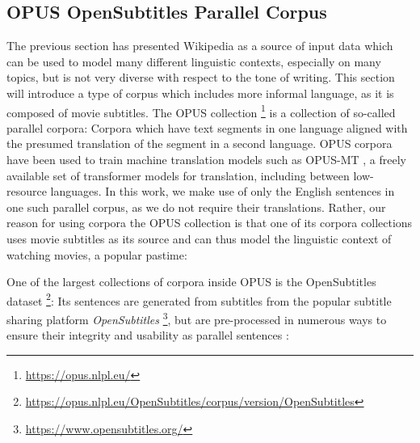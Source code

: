 \subsection{OPUS OpenSubtitles Parallel Corpus} \label{sec:opensubtitles}
The previous section has presented Wikipedia as a source of input data which can be used to model many different linguistic contexts, especially on many topics, but is not very diverse with respect to the tone of writing.
This section will introduce a type of corpus which includes more informal language, as it is composed of movie subtitles.
The OPUS collection \footnote{\url{https://opus.nlpl.eu/}} is a collection of so-called parallel corpora:
Corpora which have text segments in one language aligned with the presumed translation of the segment in a second language.
OPUS corpora have been used to train machine translation models such as OPUS-MT \cite{tiedemannOPUSMTbuildingOpenTranslation2020}, a freely available set of transformer models for translation, including between low-resource languages.
In this work, we make use of only the English sentences in one such parallel corpus, as we do not require their translations.
Rather, our reason for using corpora the OPUS collection is that one of its corpora collections uses movie subtitles as its source and can thus model the linguistic context of watching movies, a popular pastime:

One of the largest collections of corpora inside OPUS is the OpenSubtitles dataset \footnote{\url{https://opus.nlpl.eu/OpenSubtitles/corpus/version/OpenSubtitles}}:
Its sentences are generated from subtitles from the popular subtitle sharing platform \textit{OpenSubtitles} \footnote{\url{https://www.opensubtitles.org/} }, but are pre-processed in numerous ways to ensure their integrity and usability as parallel sentences \cite{lisonOpensubtitles2016ExtractingLarge2016}:

